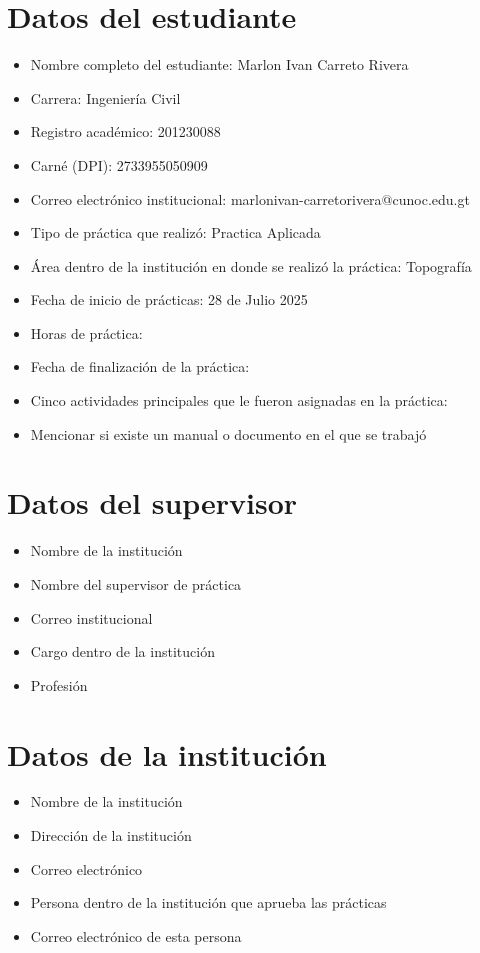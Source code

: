 \documentclass[12pt]{article}
\begin{document}
	
	\section*{Datos del estudiante}
	\begin{itemize}[label=$\blacksquare$]
		\item Nombre completo del estudiante:  Marlon Ivan Carreto Rivera
		\item Carrera: Ingeniería Civil
		\item Registro académico: 201230088
		\item Carné (DPI): 2733955050909 
		\item Correo electrónico institucional: marlonivan-carretorivera@cunoc.edu.gt
		\item Tipo de práctica que realizó: Practica Aplicada
		\item Área dentro de la institución en donde se realizó la práctica: Topografía 
		\item Fecha de inicio de prácticas: 28 de Julio 2025
		\item Horas de práctica: 
		\item Fecha de finalización de la práctica:
		\item Cinco actividades principales que le fueron asignadas en la práctica:
		\item Mencionar si existe un manual o documento en el que se trabajó
	\end{itemize}
	
	\section*{Datos del supervisor}
	\begin{itemize}[label=$\blacksquare$]
		\item Nombre de la institución
		\item Nombre del supervisor de práctica
		\item Correo institucional
		\item Cargo dentro de la institución
		\item Profesión
	\end{itemize}
	
	\section*{Datos de la institución}
	\begin{itemize}[label=$\blacksquare$]
		\item Nombre de la institución
		\item Dirección de la institución
		\item Correo electrónico
		\item Persona dentro de la institución que aprueba las prácticas
		\item Correo electrónico de esta persona
	\end{itemize}
	
\end{document}

